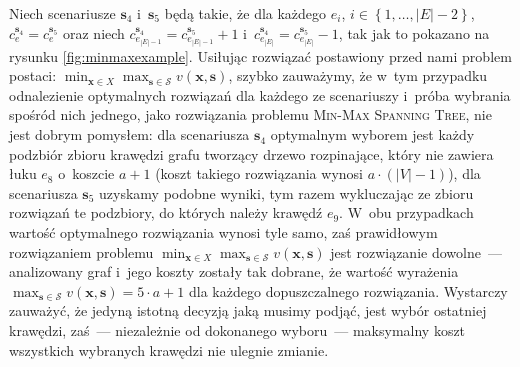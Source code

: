 Niech scenariusze $\textbf{s}_{4}$ i~$\textbf{s}_{5}$ będą takie, że dla każdego $e_{i}$, $i \in \left\{ 1, \dots, \left| E \right| - 2 \right\}$, $c^{\textbf{s}_{4}}_{e} = c^{\textbf{s}_{5}}_{e}$ oraz niech $c^{\textbf{s}_{4}}_{e_{\left| E \right| - 1}} = c^{\textbf{s}_{5}}_{e_{\left| E \right| - 1}} + 1$ i~$c^{\textbf{s}_{4}}_{e_{\left| E \right|}} = c^{\textbf{s}_{5}}_{e_{\left| E \right|}} - 1$, tak jak to pokazano na rysunku \ref{fig:minmaxexample}.
Usiłując rozwiązać postawiony przed nami problem postaci: $\min_{\textbf{x} \in X} \max_{\textbf{s} \in \mathcal{S}} v \left( \textbf{x}, \textbf{s} \right)$, szybko zauważymy, że w~tym przypadku odnalezienie optymalnych rozwiązań dla każdego ze scenariuszy i~próba wybrania spośród nich jednego, jako rozwiązania problemu \textsc{Min-Max Spanning Tree}, nie jest dobrym pomysłem: dla scenariusza $\textbf{s}_{4}$ optymalnym wyborem jest każdy podzbiór zbioru krawędzi grafu tworzący drzewo rozpinające, który nie zawiera łuku $e_{8}$ o~koszcie $a+1$ (koszt takiego rozwiązania wynosi $a \cdot \left( \left| V \right| - 1 \right)$), dla scenariusza $\textbf{s}_{5}$ uzyskamy podobne wyniki, tym razem wykluczając ze zbioru rozwiązań te podzbiory, do których należy krawędź $e_{9}$.
W~obu przypadkach wartość optymalnego rozwiązania wynosi tyle samo, zaś prawidłowym rozwiązaniem problemu $\min_{\textbf{x} \in X} \max_{\textbf{s} \in \mathcal{S}} v \left( \textbf{x}, \textbf{s} \right)$ jest rozwiązanie dowolne~--- analizowany graf i~jego koszty zostały tak dobrane, że wartość wyrażenia $\max_{\textbf{s} \in \mathcal{S}} v \left( \textbf{x}, \textbf{s} \right) = 5 \cdot a + 1$ dla każdego dopuszczalnego rozwiązania.
Wystarczy zauważyć, że jedyną istotną decyzją jaką musimy podjąć, jest wybór ostatniej krawędzi, zaś~--- niezależnie od dokonanego wyboru~--- maksymalny koszt wszystkich wybranych krawędzi nie ulegnie zmianie.


